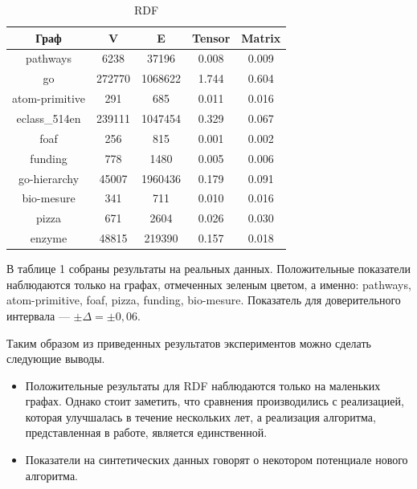 \documentclass[14pt]{matmex-diploma}
\theoremstyle{definition}
\begin{document}
\begin{table}[h]
\begin{center}
\begin{tabular}{||c|c|c|c|c||}
        \hline
        \hline
             Граф & V & E & Tensor & Matrix \\
             \hline
             \hline
             \rowcolor{green}
             pathways & 6238 & 37196 & 0.008 & 0.009\\
             \hline
             go & 272770 & 1068622 & 1.744 & 0.604 \\
             \hline
             \rowcolor{green}
             atom-primitive & 291 & 685 & 0.011 & 0.016 \\
             \hline
             eclass\_514en & 239111 & 1047454 & 0.329 & 0.067 \\
             \hline
             \rowcolor{green}
             foaf & 256 & 815 & 0.001 & 0.002 \\
             \hline
             \rowcolor{green}
             funding & 778 & 1480 & 0.005 & 0.006 \\
             \hline
             go-hierarchy & 45007 & 1960436 & 0.179 & 0.091 \\
             \hline
             \rowcolor{green}
             bio-mesure & 341 & 711 & 0.010 & 0.016 \\
             \hline
             \rowcolor{green}
             pizza & 671 & 2604 & 0.026 & 0.030 \\
             \hline
             enzyme & 48815 & 219390 & 0.157 & 0.018 \\
             \hline
             \hline
        \end{tabular}
\end{center}
\caption{RDF}
\end{table}

В таблице 1 собраны результаты на реальных данных. Положительные показатели наблюдаются только на графах, отмеченных зеленым цветом, а именно: pathways, atom-primitive, foaf, pizza, funding, bio-mesure. Показатель для доверительного интервала --- $\pm \Delta = \pm 0,06$.

Таким образом из приведенных результатов экспериментов можно сделать следующие выводы.
\begin{itemize}
    \item Положительные результаты для RDF наблюдаются только на маленьких графах. Однако стоит заметить, что сравнения производились с реализацией, которая улучшалась в течение нескольких лет, а реализация алгоритма, представленная в работе, является единственной.
    \item Показатели на синтетических данных говорят о некотором потенциале нового алгоритма.
\end{itemize}
\end{document}
